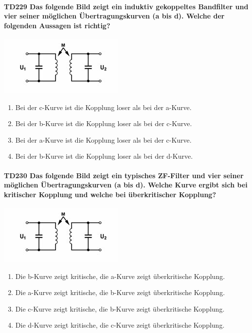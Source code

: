 \documentclass[8pt]{article}
\begin{document}
\begin{enumerate}
\begin{enumerate}[nolistsep,label=\Alph*]
{\paragraph*{TD229 Das folgende Bild zeigt ein induktiv gekoppeltes Bandfilter und vier seiner möglichen Übertragungskurven (a bis d). Welche der folgenden Aussagen ist richtig?}
\begin{center}
	\begin{minipage}{\linewidth}
		\centering
		\includegraphics[scale=1.0]{pics/td229_a.jpg}
	\end{minipage}
\end{center}
\begin{enumerate}[nolistsep,label=\Alph*]
\item Bei der c-Kurve ist die Kopplung loser als bei der a-Kurve.
\item Bei der b-Kurve ist die Kopplung loser als bei der c-Kurve.
\item Bei der a-Kurve ist die Kopplung loser als bei der c-Kurve.
\item Bei der b-Kurve ist die Kopplung loser als bei der d-Kurve.
\end{enumerate}

\paragraph*{TD230 Das folgende Bild zeigt ein typisches ZF-Filter und vier seiner möglichen Übertragungskurven (a bis d). Welche Kurve ergibt sich bei kritischer Kopplung und welche bei überkritischer Kopplung?}
\begin{center}
	\begin{minipage}{\linewidth}
		\centering
		\includegraphics[scale=1.0]{pics/td230_a.jpg}
	\end{minipage}
\end{center}
\begin{enumerate}[nolistsep,label=\Alph*]
\item Die b-Kurve zeigt kritische, die a-Kurve zeigt überkritische Kopplung.
\item Die a-Kurve zeigt kritische, die b-Kurve zeigt überkritische Kopplung.
\item Die c-Kurve zeigt kritische, die b-Kurve zeigt überkritische Kopplung.
\item Die d-Kurve zeigt kritische, die c-Kurve zeigt überkritische Kopplung.
\end{enumerate}

}
\end{enumerate}
\end{enumerate}
\end{document}
